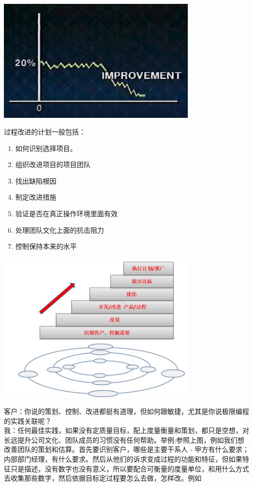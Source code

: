 \documentclass{book}        %
\providecommand{\tightlist}{%
  \setlength{\itemsep}{0pt}\setlength{\parskip}{0pt}}
\begin{document}
\includegraphics[width=10cm]{JuranImprovementScreenshot20221023211444.jpg}

过程改进的计划一般包括：

\begin{enumerate}
\tightlist
\item
  如何识别选择项目。
\item
  组织改进项目的项目团队
\item
  找出缺陷根因
\item
  制定改进措施
\item
  验证是否在真正操作环境里面有效
\item
  处理团队文化上面的抗击阻力
\item
  控制保持本来的水平\\
\end{enumerate}


\includegraphics[width=10cm]{IntroXPnJuranStepsScreenshot20221027194505.jpg}

客户：你说的策划、控制、改进都挺有道理，但如何跟敏捷，尤其是你说极限编程的实践关联呢？\\
我：任何最佳实践，如果没有定质量目标，配上度量衡量和策划，都只是空想，对长远提升公司文化、团队成员的习惯没有任何帮助。举例:参照上图，例如我们想改善团队的策划和估算。首先要识别客户，哪些是主要干系人
-
甲方有什么要求；内部部门经理，有什么要求。然后从他们的诉求变成过程的功能和特征，但如果特征只是描述，没有数字也没有意义，所以要配合可衡量的度量单位，和用什么方式去收集那些数字，然后依据目标定过程要怎么去做，怎样改。例如
\end{document}
